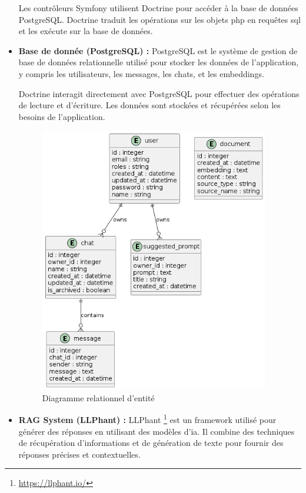 \begin{itemize}
    Les contrôleurs Symfony utilisent Doctrine pour accéder à la base de données PostgreSQL. Doctrine traduit les opérations sur les objets \acs{php} en requêtes \acs{sql} et les exécute sur la base de données.

    \item \textbf{Base de donnée (PostgreSQL) :}
    PostgreSQL est le système de gestion de base de données relationnelle utilisé pour stocker les données de l'application, y compris les utilisateurs, les messages, les chats, et les embeddings.
    
    Doctrine interagit directement avec PostgreSQL pour effectuer des opérations de lecture et d'écriture. Les données sont stockées et récupérées selon les besoins de l'application.

    \begin{figure}[H]
        \centering
        \includegraphics[width=10cm]{gfx/fig-database-schema.png}
        \caption{Diagramme relationnel d'entité}
        \label{fig:database-schema}
    \end{figure}

    \item \textbf{RAG System (LLPhant) :}
    LLPhant \footnote{\href{https://llphant.io/}{https://llphant.io/}} est un framework utilisé pour générer des réponses en utilisant des modèles d'\ac{ia}. Il combine des techniques de récupération d'informations et de génération de texte pour fournir des réponses précises et contextuelles.
    

\end{itemize}
